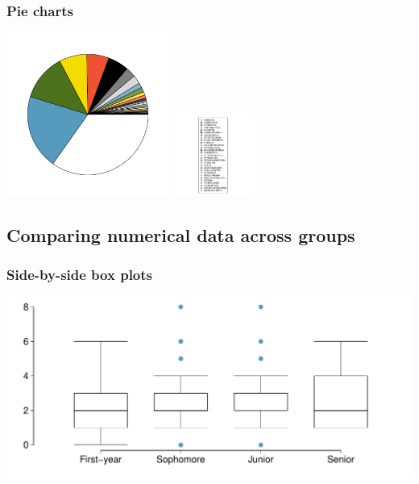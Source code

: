 \begin{frame}
\frametitle{Pie charts}


\vspace{-0.5cm}

\begin{center}
\includegraphics[width=0.4\textwidth]{2-2_categorical_data/figures/mammal_pie_chart/mammal_pie_chart}
\includegraphics[width=0.2\textwidth]{2-2_categorical_data/figures/mammal_pie_chart/mammal_pie_chart_legend}
\end{center}


\end{frame}



\subsection{Comparing numerical data across groups}


\begin{frame}
\frametitle{Side-by-side box plots}


\begin{center}
\includegraphics[width=\textwidth]{2-2_categorical_data/figures/year_clubs/year_clubs}
\end{center}

\end{frame}


